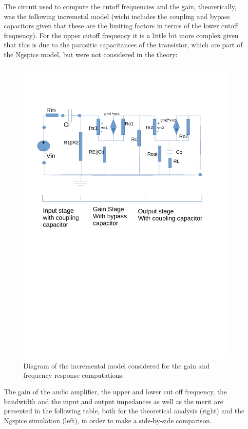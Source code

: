 The circuit used to compute the cutoff frequencies and the gain, theoretically, was the following incremetal model (wichi includes the coupling and bypass capacitors given that these are the limiting factors in terms of the lower cutoff frequency). For the upper cutoff frequency it is a little bit more complex given that this is due to the parasitic capacitances of the transistor, which are part of the Ngspice model, but were not considered in the theory: 

\begin{figure}[h] \centering
\includegraphics[width=0.95\linewidth]{incremental_t4.pdf}
\vspace{-7cm}
\caption{Diagram of the incremental model considered for the gain and frequency response computations.}
\label{fig:diagram_t4}
\end{figure}

The gain of the audio amplifier, the upper and lower cut off frequency, the bandwidth and the input and output impedances as well as the merit are presented in the following table, both for the theoretical analysis (right) and the Ngspice simulation (left), in order to make a side-by-side comparison.

